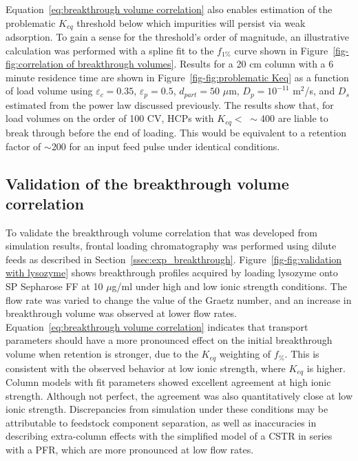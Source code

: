 \documentclass[preprint,review,12pt]{elsarticle}
\begin{document}
        Equation~\ref{eq:breakthrough volume correlation} also enables estimation of the problematic $K_{eq}$ threshold below which impurities will persist via weak adsorption. To gain a sense for the threshold's order of magnitude, an illustrative calculation was performed with a spline fit to the $f_{1\%}$ curve shown in Figure~\ref{fig-fig:correlation of breakthrough volumes}. Results for a 20 cm column with a 6 minute residence time are shown in Figure~\ref{fig-fig:problematic Keq} as a function of load volume using $\varepsilon_c = 0.35$, $\varepsilon_p = 0.5$, $d_{part} = 50$ $\mu$m, $D_p = 10^{-11}$ m$^2$/s, and $D_s$ estimated from the power law discussed previously. The results show that, for load volumes on the order of 100 CV, HCPs with $K_{eq} < \; \sim$400 are liable to break through before the end of loading. This would be equivalent to a retention factor of $\sim$200 for an input feed pulse under identical conditions.


    \subsection{Validation of the breakthrough volume correlation} \label{ssec:validation}

       To validate the breakthrough volume correlation that was developed from simulation results, frontal loading chromatography was performed using dilute feeds as described in Section~\ref{ssec:exp_breakthrough}. Figure~\ref{fig-fig:validation with lysozyme} shows breakthrough profiles acquired by loading lysozyme onto SP Sepharose FF at 10 $\mu$g/ml under high and low ionic strength conditions. The flow rate was varied to change the value of the Graetz number, and an increase in breakthrough volume was observed at lower flow rates. Equation~\ref{eq:breakthrough volume correlation} indicates that transport parameters should have a more pronounced effect on the initial breakthrough volume when retention is stronger, due to the $K_{eq}$ weighting of $f_\%$. This is consistent with the observed behavior at low ionic strength, where $K_{eq}$ is higher. Column models with fit parameters showed excellent agreement at high ionic strength. Although not perfect, the agreement was also quantitatively close at low ionic strength. Discrepancies from simulation under these conditions may be attributable to feedstock component separation, as well as inaccuracies in describing extra-column effects with the simplified model of a CSTR in series with a PFR, which are more pronounced at low flow rates.
\end{document}
